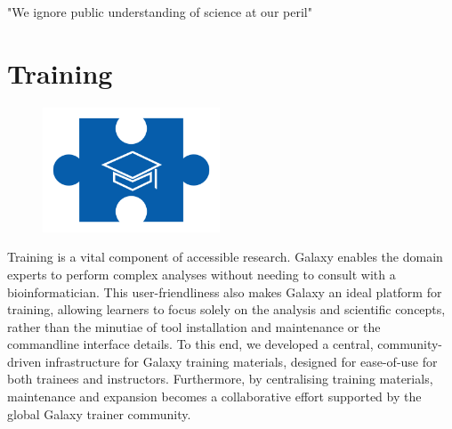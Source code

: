 \begin{savequote}[75mm]
"We ignore public understanding of science at our peril"
\end{savequote}

\chapter{Training}\label{chapter:training}

\begin{figure}[t!]
\includegraphics[height=10em]{frontmatter/images/chapter-header-2.png}
\end{figure}
\setcounter{figure}{-1}
\setcounter{table}{-1}
\setcounter{section}{-1}

Training is a vital component of accessible research. Galaxy enables the domain experts to perform complex analyses without needing to consult with a bioinformatician. This user-friendliness also makes Galaxy an ideal platform for training, allowing learners to focus solely on the analysis and scientific concepts, rather than the minutiae of tool installation and maintenance or the commandline interface details. To this end, we developed a central, community-driven infrastructure for Galaxy training materials, designed for ease-of-use for both trainees and instructors. Furthermore, by centralising training materials, maintenance and expansion becomes a collaborative effort supported by the global Galaxy trainer community.
